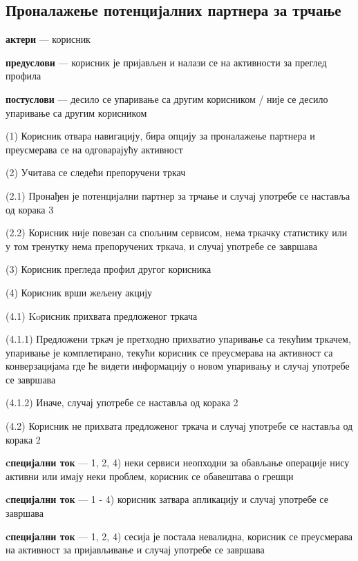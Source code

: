 \documentclass[12pt,oneside]{memoir}
\begin{document}
\subsection{Проналажење потенцијалних партнера за трчање}
\begin{description}
    \item \textbf{актери} --- корисник
    \item \textbf{предуслови} --- корисник је пријављен и налази се на активности за преглед профила
    \item \textbf{постуслови} --- десило се упаривање са другим корисником / није се десило упаривање са другим корисником
    \item (1) Корисник отвара навигацију, бира опцију за проналажење партнера и преусмерава се на одговарајућу активност
    \item (2) Учитава се следећи препоручени тркач
    \begin{description}
        \item (2.1) Пронађен је потенцијални партнер за трчање и случај употребе се наставља од корака 3
        \item (2.2) Корисник није повезан са спољним сервисом, нема тркачку статистику или у том тренутку нема препоручених тркача, и случај употребе се завршава 
    \end{description}
    \item (3) Корисник прегледа профил другог корисника
    \item (4) Корисник врши жељену акцију
    \begin{description}
        \item (4.1) Koрисник прихвата предложеног тркача
        \begin{description}
            \item (4.1.1) Предложени тркач је претходно прихватио упаривање са текућим тркачем, упаривање је комплетирано, текући корисник се преусмерава на активност са конверзацијама где ће видети информацију о новом упаривању и случај употребе се завршава
            \item (4.1.2) Иначе, случај употребе се наставља од корака 2
        \end{description}
        \item (4.2) Корисник не прихвата предложеног тркача и случај употребе се наставља од корака 2
    \end{description}
    \item \textbf{cпецијални ток} --- 1, 2, 4) неки сервиси неопходни за обављање операције нису активни или имају неки проблем, корисник се обавештава о грешци
    \item \textbf{cпецијални ток} --- 1 - 4) корисник затвара апликацију и случај употребе се завршава
    \item \textbf{cпецијални ток} --- 1, 2, 4) сесија је постала невалидна, корисник се преусмерава на активност за пријављивање и случај употребе се завршава
\end{description}
\end{document}
